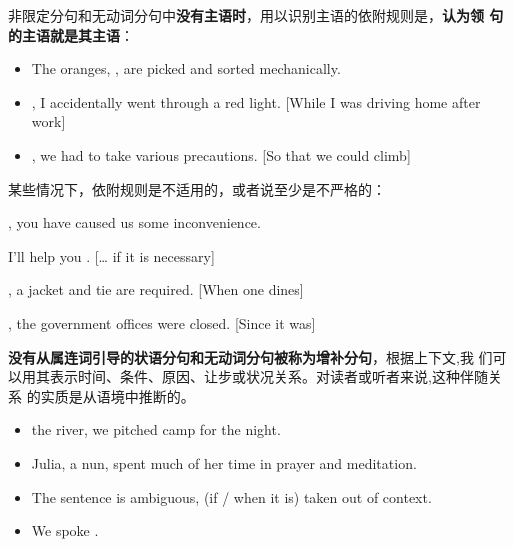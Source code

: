 非限定分句和无动词分句中\textbf{没有主语时}，用以识别主语的依附规则是，\textbf{认为领
句的主语就是其主语}：
\begin{itemize}
\item The oranges, , are picked and sorted
  mechanically.

\item {}, I accidentally went through a red
  light. [While I was driving home after work]

\item {}, we had to take various precautions. [So that
  we could climb]

\end{itemize}

某些情况下，依附规则是不适用的，或者说至少是不严格的：
\begin{description}[style=nextline]
\item[分句是一个主语外接状语, 这时隐含的主语是说话者 I]

  , you have caused us some inconvenience.

\item[隐含的主语是整个主句]

  I'll help you . [\ldots{} if it is necessary]

\item[隐含的主语是一个不定代词或支撑词 it]

  , a jacket and tie are required. [When one
  dines]

  , the government offices were closed. [Since it was]
\end{description}


\textbf{没有从属连词引导的状语分句和无动词分句被称为增补分句}，根据上下文,我
们可以用其表示时间、条件、原因、让步或状况关系。对读者或听者来说,这种伴随关系
的实质是从语境中推断的。

\begin{itemize}
\item {} the river, we pitched camp for the night.
\item Julia,  a nun, spent much of her time in
  prayer and meditation.
\item The sentence is ambiguous, (if / when it is) taken out of context.

\item We spoke .
\end{itemize}

